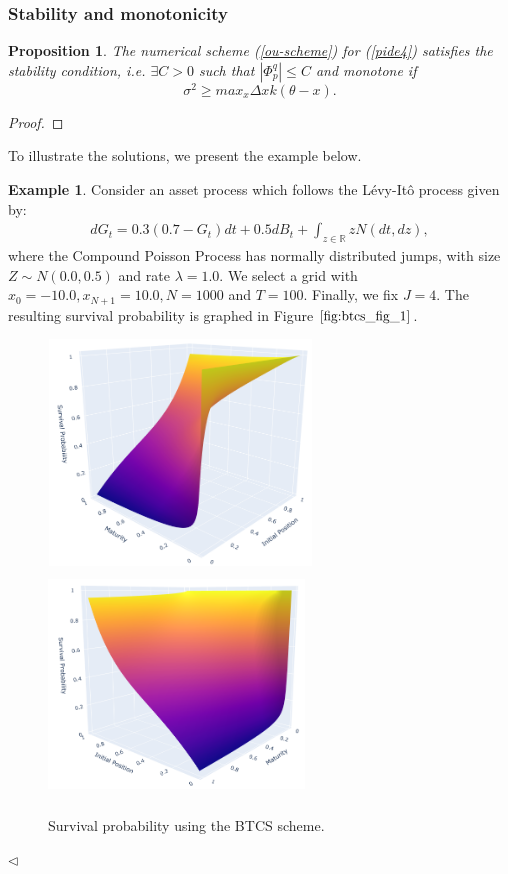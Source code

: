 \documentclass[11pt,reqno]{article}
\newtheorem{proposition}[theorem]{Proposition}
\theoremstyle{definition}
\newtheorem{example}[theorem]{Example}
\begin{document}
\subsubsection{Stability and monotonicity}
\begin{proposition}
	The numerical scheme (\ref{ou-scheme}) for (\ref{pide4}) satisfies the stability condition, i.e. $\exists C > 0$ such that $|\Phi_p^q| \leq C$ and monotone if
	$$ \sigma ^2 \geq max_{x}\Delta x k (\theta -x).$$
	
\end{proposition}

\begin{proof}

\end{proof}

\par To illustrate the solutions, we present the example below. 
\begin{example}\label{ex}
	Consider an asset process which follows the L\'evy-It\^o process given by:
	\begin{eqnarray}
		dG_t=0.3(0.7 - G_t)dt + 0.5 dB_t +  \int_{z\in \mathbb{R}} z N(dt,dz),
	\end{eqnarray}
	where the Compound Poisson Process has normally distributed jumps, with size $Z \sim N(0.0,0.5)$ and rate $\lambda = 1.0$. We select a grid with $x_0 =-10.0, x_{N+1} =10.0, N = 1000$ and $T=100$. Finally, we fix $J=4$. The resulting survival probability is graphed in Figure $\ref{fig:btcs_fig_1}$.
	
	
	\begin{figure}[h ]
		\begin{center}
			\includegraphics[height= 60mm, width=70mm,scale=0.3]{PD_example_5_3_1.png}
			\includegraphics[height=60mm, width=68mm, scale=0.3]{PD_example_5_3_2.png}
		\end{center}
		\caption{Survival probability using the BTCS scheme.}
		\label{fig:btcs_fig_1}
	\end{figure}
\end{example} \hfill $\triangleleft$
\end{document}
